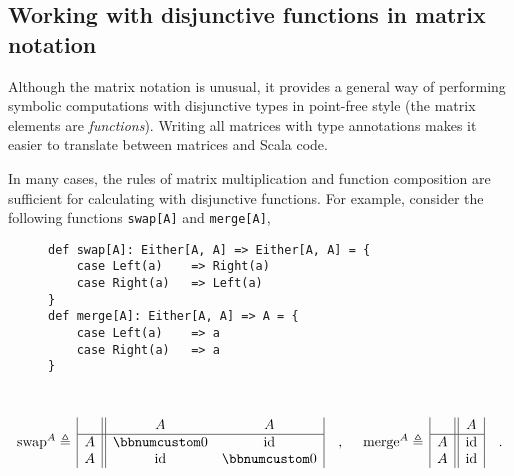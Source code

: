 \subsection{Working with disjunctive functions in matrix notation\label{subsec:Working-with-disjunctive-functions}}

Although the matrix notation is unusual, it provides a general way
of performing symbolic computations with disjunctive types in point-free
style (the matrix elements are \emph{functions}). Writing all matrices
with type annotations makes it easier to translate between matrices
and Scala code.

In many cases, the rules of matrix multiplication and function composition
are sufficient for calculating with disjunctive functions. For example,
consider the following functions \lstinline!swap[A]! and \lstinline!merge[A]!,

\begin{wrapfigure}{L}{0.46\columnwidth}%
\vspace{-0.85\baselineskip}
\begin{lstlisting}
def swap[A]: Either[A, A] => Either[A, A] = {
    case Left(a)    => Right(a)
    case Right(a)   => Left(a)
}
def merge[A]: Either[A, A] => A = {
    case Left(a)    => a
    case Right(a)   => a
}
\end{lstlisting}

\vspace{-1\baselineskip}
\end{wrapfigure}%

~\vspace{-1.2\baselineskip}
\[
\text{swap}^{A}\triangleq\,\begin{array}{|c||cc|}
 & A & A\\
\hline A & \bbnum 0 & \text{id}\\
A & \text{id} & \bbnum 0
\end{array}\quad,~\quad\text{merge}^{A}\triangleq\,\begin{array}{|c||c|}
 & A\\
\hline A & \text{id}\\
A & \text{id}
\end{array}\quad.
\]
\vspace{-0.4\baselineskip}

